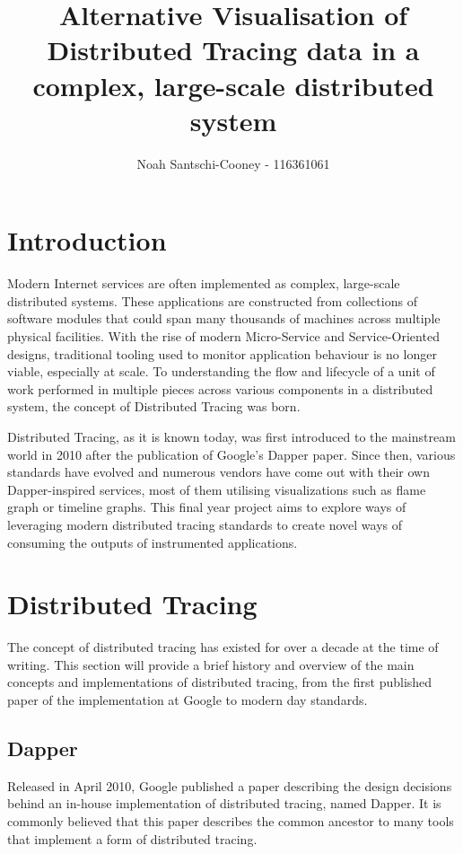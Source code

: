 \documentclass[pdftex,titlepage]{article}
\author{Noah Santschi-Cooney - 116361061}
\title{\textbf{Alternative Visualisation of Distributed Tracing data in a complex, large-scale distributed system}}
\begin{document}
    \maketitle
    \section{Introduction}

    Modern Internet services are often implemented as complex, large-scale distributed systems. 
    These applications are constructed from collections of software modules that could span many
    thousands of machines across multiple physical facilities. With the rise of modern 
    Micro-Service and Service-Oriented designs, traditional tooling used to monitor application 
    behaviour is no longer viable, especially at scale\cite{retrospective}. To understanding the flow and lifecycle 
    of a unit of work performed in multiple pieces across various components in a distributed system, 
    the concept of Distributed Tracing was born\cite{xtrace}. 
    
    Distributed Tracing, as it is known today, was first introduced to the mainstream world in 2010 after the publication
    of Google’s Dapper paper\cite{dapper}. Since then, various standards have evolved and numerous vendors have
    come out with their own Dapper-inspired services, most of them utilising visualizations such as
    flame graph or timeline graphs. This final year project aims to explore ways of leveraging modern 
    distributed tracing standards to create novel ways of consuming the outputs of instrumented applications.

    \section{Distributed Tracing}
    The concept of distributed tracing has existed for over a decade at the time of writing. 
    This section will provide a brief history and overview of the main concepts and implementations of distributed tracing,
    from the first published paper of the implementation at Google to modern day standards.

        \subsection{Dapper}
        Released in April 2010, Google published a paper describing the design decisions behind an in-house implementation 
        of distributed tracing, named Dapper. It is commonly believed that this paper describes the common ancestor to 
        many tools that implement a form of distributed tracing.
\end{document}
